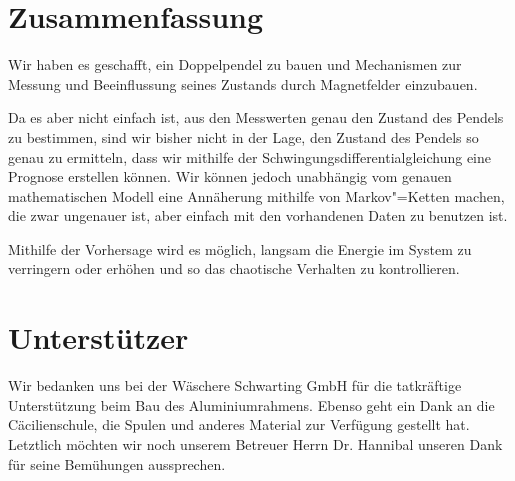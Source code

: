 \documentclass[a4paper, 10pt]{article}
\begin{document}




\clearpage
\section{Zusammenfassung}
Wir haben es geschafft, ein Doppelpendel zu bauen und Mechanismen zur Messung und Beeinflussung seines
Zustands durch Magnetfelder einzubauen.

Da es aber nicht einfach ist, aus den Messwerten genau den
Zustand des Pendels zu bestimmen, sind wir bisher nicht in der Lage, den Zustand des Pendels so genau
zu ermitteln, dass wir mithilfe der Schwingungsdifferentialgleichung eine Prognose erstellen können. Wir
können jedoch unabhängig vom genauen mathematischen Modell eine Annäherung mithilfe von Markov"=Ketten machen, die zwar ungenauer ist, aber einfach mit den vorhandenen Daten zu benutzen ist.

Mithilfe der Vorhersage wird es möglich, langsam die Energie im System zu verringern oder erhöhen und so das chaotische Verhalten zu kontrollieren.

\section*{Unterstützer}

Wir bedanken uns bei der Wäschere Schwarting GmbH für die tatkräftige Unterstützung beim Bau des Aluminiumrahmens.
Ebenso geht ein Dank an die Cäcilienschule, die Spulen und anderes Material zur Verfügung gestellt hat.
Letztlich möchten wir noch unserem Betreuer Herrn Dr. Hannibal unseren Dank für seine Bemühungen aussprechen.


{}
\end{document}
